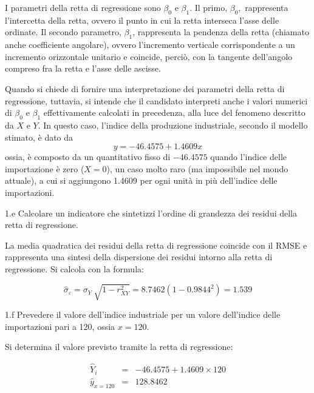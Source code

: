 \documentclass[
  11pt,
]{book}
\theoremstyle{mytheoremstyle}
\theoremstyle{mydefstyle}
\newenvironment{sol}
  {
  \begin{tcolorbox}[enhanced,breakable,arc=0.1mm,boxrule=1pt,colback=white,colframe=iblue,
  title=\bf \fontfamily{lmss}\selectfont \hspace{.5 cm} Soluzione,drop fuzzy shadow]

}{
\end{tcolorbox}
  }
\begin{document}
\begin{sol}
I parametri della retta di regressione sono \(\beta_{0}\) e \(\beta_{1}\).
Il primo, \(\beta_{0},\) rappresenta l'intercetta della retta, ovvero il
punto in cui la retta interseca l'asse delle ordinate.
Il secondo parametro, \(\beta_{1}\), rappresenta la pendenza della retta
(chiamato anche coefficiente angolare), ovvero l'incremento verticale
corrispondente a un incremento orizzontale unitario e coincide, perciò,
con la tangente dell'angolo compreso fra la retta e l'asse delle ascisse.

Quando si chiede di fornire una interpretazione dei parametri della retta
di regressione, tuttavia, si intende che il candidato interpreti anche
i valori numerici di \(\beta_{0}\) e \(\beta_{1}\) effettivamente calcolati
in precedenza, alla luce del fenomeno descritto da \(X\) e \(Y\).
In questo caso, l'indice della produzione industriale, secondo il modello
stimato, è dato da
\[y= -46.4575 + 1.4609 x\]
ossia, è composto da un quantitativo fisso di \(-46.4575\) quando l'indice
delle importazione è zero (\(X=0\)), un caso molto raro (ma impossibile
nel mondo attuale), a cui si aggiungono 1.4609 per ogni unità in più
dell'indice delle importazioni.

\end{sol}

1.e Calcolare un indicatore che sintetizzi l'ordine
di grandezza dei residui della retta di regressione.

\begin{sol}
La media quadratica dei residui della retta di regressione coincide con
il RMSE e rappresenta una sintesi della dispersione dei residui intorno
alla retta di regressione. Si calcola con la formula:

\begin{displaymath}
\hat\sigma_\varepsilon
= \sigma_{Y}\ \sqrt{1- r^2_{XY}} = 8.7462(1-0.9844^2) = 1.539
\end{displaymath}

\end{sol}

1.f Prevedere il valore dell'indice industriale per un valore
dell'indice delle importazioni pari a 120, ossia \(x=120\).

\begin{sol}
Si determina il valore previsto tramite la retta di regressione:

\begin{eqnarray*}
\widehat{Y}_{i}     &=& -46.4575 + 1.4609\times 120 \\
\widehat{y}_{x=120} &=& 128.8462
\end{eqnarray*}

\end{sol}
\end{document}
